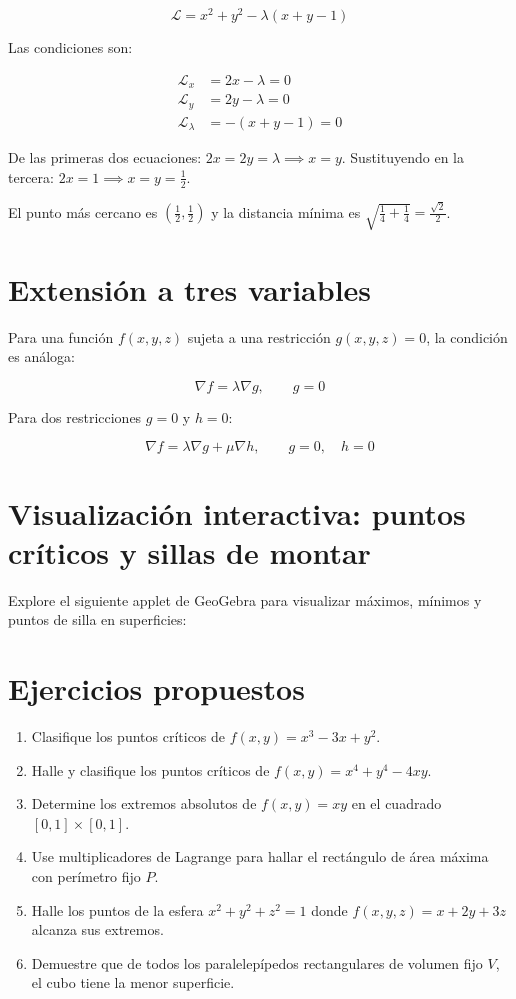 \documentclass[
]{book}
\providecommand{\tightlist}{%
  \setlength{\itemsep}{0pt}\setlength{\parskip}{0pt}}
\begin{document}
\[
\mathcal{L} = x^2 + y^2 - \lambda(x + y - 1)
\]

Las condiciones son:

\[
\begin{aligned}
\mathcal{L}_x &= 2x - \lambda = 0 \\
\mathcal{L}_y &= 2y - \lambda = 0 \\
\mathcal{L}_\lambda &= -(x + y - 1) = 0
\end{aligned}
\]

De las primeras dos ecuaciones: \(2x = 2y = \lambda \implies x = y\). Sustituyendo en la tercera: \(2x = 1 \implies x = y = \frac{1}{2}\).

El punto más cercano es \((\frac{1}{2}, \frac{1}{2})\) y la distancia mínima es \(\sqrt{\frac{1}{4} + \frac{1}{4}} = \frac{\sqrt{2}}{2}\).

\section{Extensión a tres variables}\label{extensiuxf3n-a-tres-variables}

Para una función \(f(x, y, z)\) sujeta a una restricción \(g(x, y, z) = 0\), la condición es análoga:

\[
\nabla f = \lambda \nabla g, \qquad g = 0
\]

Para dos restricciones \(g = 0\) y \(h = 0\):

\[
\nabla f = \lambda \nabla g + \mu \nabla h, \qquad g = 0, \quad h = 0
\]

\section{Visualización interactiva: puntos críticos y sillas de montar}\label{visualizaciuxf3n-interactiva-puntos-cruxedticos-y-sillas-de-montar}

Explore el siguiente applet de GeoGebra para visualizar máximos, mínimos y puntos de silla en superficies:

\section{Ejercicios propuestos}\label{ejercicios-propuestos-4}

\begin{enumerate}
\def\labelenumi{\arabic{enumi}.}
\tightlist
\item
  Clasifique los puntos críticos de \(f(x, y) = x^3 - 3x + y^2\).
\item
  Halle y clasifique los puntos críticos de \(f(x, y) = x^4 + y^4 - 4xy\).
\item
  Determine los extremos absolutos de \(f(x, y) = xy\) en el cuadrado \([0, 1] \times [0, 1]\).
\item
  Use multiplicadores de Lagrange para hallar el rectángulo de área máxima con perímetro fijo \(P\).
\item
  Halle los puntos de la esfera \(x^2 + y^2 + z^2 = 1\) donde \(f(x, y, z) = x + 2y + 3z\) alcanza sus extremos.
\item
  Demuestre que de todos los paralelepípedos rectangulares de volumen fijo \(V\), el cubo tiene la menor superficie.
\end{enumerate}
\end{document}
